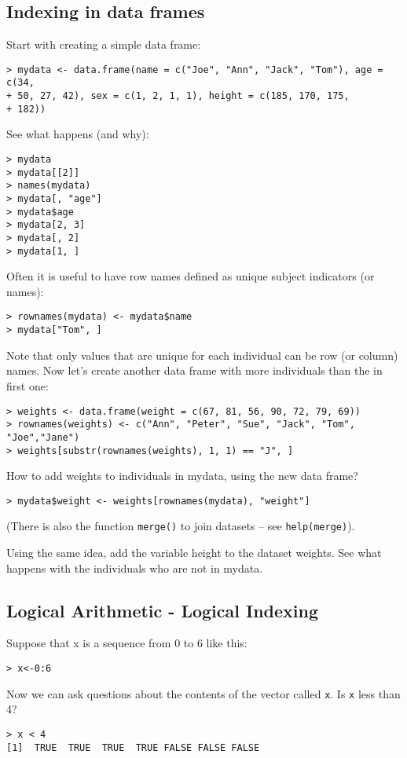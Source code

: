 \documentclass[12pt]{article}
\begin{document}
\subsection{Indexing in data frames}
Start with creating a simple data frame:
\begin{verbatim}
> mydata <- data.frame(name = c("Joe", "Ann", "Jack", "Tom"), age = c(34,
+ 50, 27, 42), sex = c(1, 2, 1, 1), height = c(185, 170, 175,
+ 182))
\end{verbatim}

See what happens (and why):
\begin{verbatim}
> mydata
> mydata[[2]]
> names(mydata)
> mydata[, "age"]
> mydata$age
> mydata[2, 3]
> mydata[, 2]
> mydata[1, ]
\end{verbatim}

Often it is useful to have row names defined as unique subject indicators (or names):
\begin{verbatim}
> rownames(mydata) <- mydata$name
> mydata["Tom", ]
\end{verbatim}

Note that only values that are unique for each individual can be row (or column) names.
Now let’s create another data frame with more individuals than the in first one:
\begin{verbatim}
> weights <- data.frame(weight = c(67, 81, 56, 90, 72, 79, 69))
> rownames(weights) <- c("Ann", "Peter", "Sue", "Jack", "Tom", "Joe","Jane")
> weights[substr(rownames(weights), 1, 1) == "J", ]
\end{verbatim}

How to add weights to individuals in mydata, using the new data frame?
\begin{verbatim}
> mydata$weight <- weights[rownames(mydata), "weight"]
\end{verbatim}

(There is also the function \texttt{merge()} to join datasets – see \texttt{help(merge)}).

Using the same idea, add the variable height to the dataset weights.
See what happens with the individuals who are not in mydata.

\subsection{Logical Arithmetic - Logical Indexing}
Suppose that x is a sequence from 0 to 6 like this:
\begin{verbatim}
> x<-0:6
\end{verbatim}
Now we can ask questions about the contents of the vector called \texttt{x}. Is \texttt{x} less than 4?
\begin{verbatim}
> x < 4
[1]  TRUE  TRUE  TRUE  TRUE FALSE FALSE FALSE
\end{verbatim}
\end{document}
